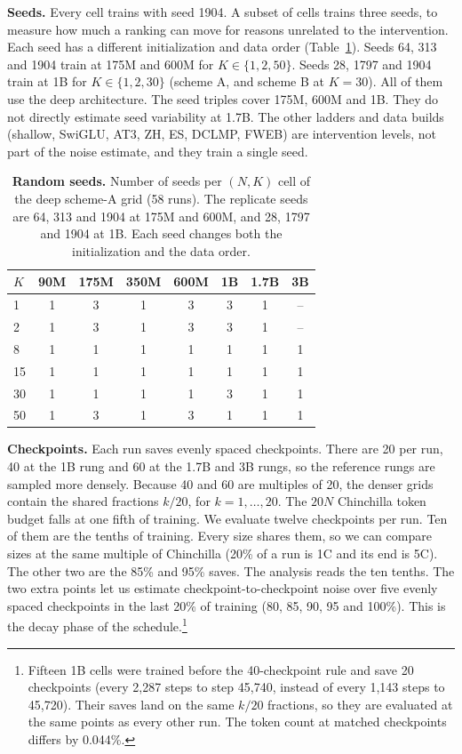 \textbf{Seeds.} Every cell trains with seed 1904. A subset of cells trains three seeds, to measure how much a ranking can move for reasons unrelated to the intervention. Each seed has a different initialization and data order (Table~\ref{tab:grid-seeds}). Seeds 64, 313 and 1904 train at 175M and 600M for $K \in \{1, 2, 50\}$. Seeds 28, 1797 and 1904 train at 1B for $K \in \{1, 2, 30\}$ (scheme A, and scheme B at $K=30$). All of them use the deep architecture. The seed triples cover 175M, 600M and 1B. They do not directly estimate seed variability at 1.7B. The other ladders and data builds (shallow, SwiGLU, AT3, ZH, ES, DCLMP, FWEB) are intervention levels, not part of the noise estimate, and they train a single seed.

\begin{table}[t]
\centering
\small
\begin{tabular}{lccccccc}
\toprule
$K$ & 90M & 175M & 350M & 600M & 1B & 1.7B & 3B \\
\midrule
1 & 1 & 3 & 1 & 3 & 3 & 1 & -- \\
2 & 1 & 3 & 1 & 3 & 3 & 1 & -- \\
8 & 1 & 1 & 1 & 1 & 1 & 1 & 1 \\
15 & 1 & 1 & 1 & 1 & 1 & 1 & 1 \\
30 & 1 & 1 & 1 & 1 & 3 & 1 & 1 \\
50 & 1 & 3 & 1 & 3 & 1 & 1 & 1 \\
\bottomrule
\end{tabular}
\caption{\textbf{Random seeds.} Number of seeds per $(N, K)$ cell of the deep scheme-A grid (58 runs). The replicate seeds are 64, 313 and 1904 at 175M and 600M, and 28, 1797 and 1904 at 1B. Each seed changes both the initialization and the data order.}
\label{tab:grid-seeds}
\end{table}

\textbf{Checkpoints.} Each run saves evenly spaced checkpoints. There are 20 per run, 40 at the 1B rung and 60 at the 1.7B and 3B rungs, so the reference rungs are sampled more densely. Because 40 and 60 are multiples of 20, the denser grids contain the shared fractions $k/20$, for $k=1,\ldots,20$. The $20N$ Chinchilla token budget falls at one fifth of training. We evaluate twelve checkpoints per run. Ten of them are the tenths of training. Every size shares them, so we can compare sizes at the same multiple of Chinchilla (20\% of a run is 1C and its end is 5C). The other two are the 85\% and 95\% saves. The analysis reads the ten tenths. The two extra points let us estimate checkpoint-to-checkpoint noise over five evenly spaced checkpoints in the last 20\% of training (80, 85, 90, 95 and 100\%). This is the decay phase of the schedule.\footnote{Fifteen 1B cells were trained before the 40-checkpoint rule and save 20 checkpoints (every 2,287 steps to step 45,740, instead of every 1,143 steps to 45,720). Their saves land on the same $k/20$ fractions, so they are evaluated at the same points as every other run. The token count at matched checkpoints differs by 0.044\%.}

